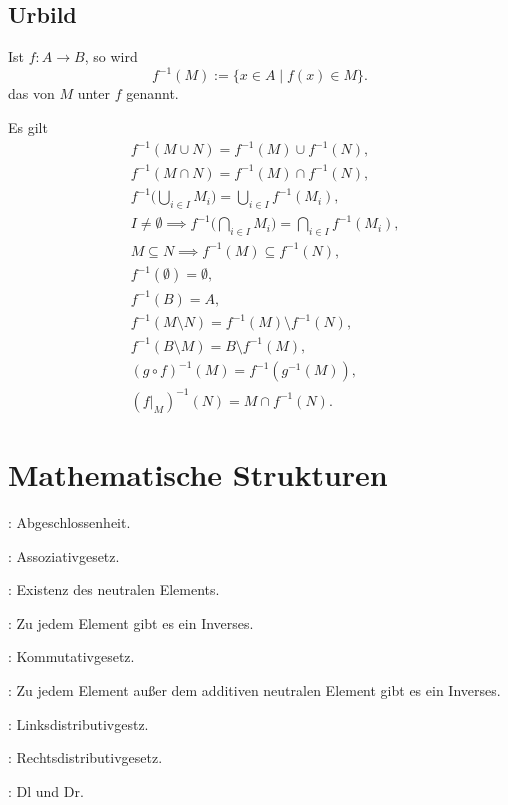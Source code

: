 \subsection{Urbild}
\begin{Definition}
Ist $f\colon A\to B$, so wird
\begin{equation}
f^{-1}(M) := \{x\in A\mid f(x)\in M\}.
\end{equation}
das  von $M$ unter $f$ genannt.
\end{Definition}
Es gilt
\begin{align}
& f^{-1}(M\cup N) = f^{-1}(M)\cup f^{-1}(N),\\
& f^{-1}(M\cap N) = f^{-1}(M)\cap f^{-1}(N),\\
& f^{-1}\Big(\bigcup_{i\in I}M_i\Big) = \bigcup_{i\in I} f^{-1}(M_i),\\
& I\ne\emptyset\implies f^{-1}\Big(\bigcap_{i\in I} M_i\Big) = \bigcap_{i\in I}f^{-1}(M_i),\\
& M\subseteq N\implies f^{-1}(M)\subseteq f^{-1}(N),\\
& f^{-1}(\emptyset) = \emptyset,\\
& f^{-1}(B) = A,\\
& f^{-1}(M\setminus N) = f^{-1}(M)\setminus f^{-1}(N),\\
& f^{-1}(B\setminus M) = B\setminus f^{-1}(M),\\
& (g\circ f)^{-1}(M) = f^{-1}(g^{-1}(M)),\\
& (f|_M)^{-1}(N) = M\cap f^{-1}(N).
\end{align}

\section{Mathematische Strukturen}

: Abgeschlossenheit.

: Assoziativgesetz.

: Existenz des neutralen Elements.

: Zu jedem Element gibt es ein Inverses.

: Kommutativgesetz.

: Zu jedem Element außer dem additiven neutralen Element
gibt es ein Inverses.

: Linksdistributivgestz.

: Rechtsdistributivgesetz.

: Dl und Dr.

